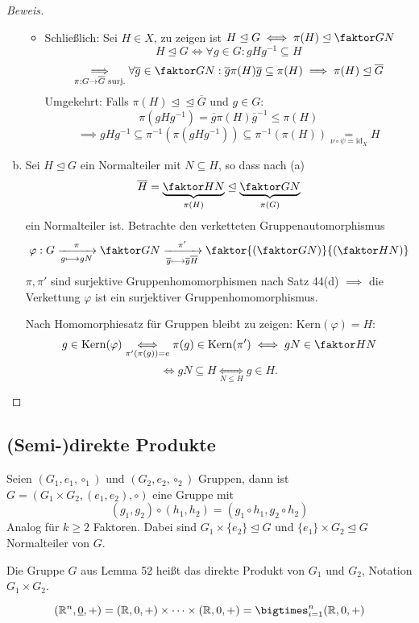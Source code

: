 \documentclass[a4paper]{report}
\begin{document}
\begin{satz}
\begin{proof}[Beweis]
\begin{enumerate}[(a)]
\begin{itemize}
  \item Schließlich: Sei $H \in X$, zu zeigen ist $H \trianglelefteq G \iff \pi(H) \trianglelefteq \faktor GN$
        $$H \trianglelefteq G \iff \forall g \in G : gHg^{-1} \subseteq H$$
        $$\underset{\pi: G \to \overline G \text{ surj.}}\implies \forall \overline g \in \faktor GN: \overline g \pi(H)\overline g \subseteq \pi(H) \implies \pi(H) \trianglelefteq \overline G$$
        Umgekehrt: Falls $\pi(H) \trianglelefteq \trianglelefteq \overline G$ und $g \in G$:
        $$\pi(gHg^{-1}) = \overline g\pi(H)\overline g^{-1} \le \pi(H)$$
        $$\implies gHg^{-1} \subseteq \pi^{-1}(\pi(gHg^{-1})) \subseteq \pi^{-1}(\pi(H)) \underset{\nu \circ \psi = \mathrm{id}_{X}} = H$$
\end{itemize}
    \item Sei $H \trianglelefteq G$ ein Normalteiler mit $N \subseteq H$, so dass nach (a)
          $$\overline H = \underbrace{\faktor HN}_{\pi(H)} \trianglelefteq \underbrace{\faktor GN}_{\pi(G)}$$
          ein Normalteiler ist. Betrachte den verketteten Gruppenautomorphismus
          $$\varphi : G \xrightarrow[g \longmapsto gN]{\pi}\faktor GN \xrightarrow[\overline g \longmapsto \overline g \overline H]{\pi'} \faktor{\left(\faktor GN\right)}{\left(\faktor HN\right)}$$
          $\pi, \pi'$ sind surjektive Gruppenhomomorphismen nach Satz 44(d) $\implies$ die Verkettung $\varphi$ ist ein surjektiver Gruppenhomomorphismus.

          Nach Homomorphiesatz für Gruppen bleibt zu zeigen: $\mathrm{Kern}(\varphi) = H$:
          $$g \in \mathrm{Kern}(\varphi) \underset{\pi'(\pi(g))=e}\iff\pi(g) \in \mathrm{Kern}(\pi') \iff gN \in \faktor HN$$
          $$\iff gN \subseteq H \underset{N \le H}\iff g \in H.$$
  \end{enumerate}
\end{proof}
\end{satz}

\subsection*{(Semi-)direkte Produkte}%
\label{sec:Direkte Produkte}
\begin{lemm}[Übung]
  Seien $(G_{1}, e_{1}, \circ_{1})$ und $(G_{2}, e_{2}, \circ_{2})$ Gruppen, dann ist $G = (G_{1} \times G_{2}, (e_{1}, e_{2}), \circ)$ eine Gruppe mit
  $$(g_{1}, g_{2}) \circ (h_{1}, h_{2}) = (g_{1} \circ h_{1}, g_{2} \circ h_{2})$$
  Analog für $k \ge 2$ Faktoren. Dabei sind $G_{1} \times \{e_{2}\} \trianglelefteq G$ und $\{e_{1}\} \times G_{2} \trianglelefteq G$ Normalteiler von $G$.
\end{lemm}
\begin{defi} Die Gruppe $G$ aus Lemma 52 heißt das direkte Produkt von $G_{1}$ und $G_{2}$, Notation $G_{1} \times G_{2}$.
\end{defi}
\begin{bsp*}
$$(\Bbb R^{n}, \underline 0, +) = (\Bbb R, 0, +) \times \cdots \times (\Bbb R, 0, +) = \bigtimes_{i = 1}^{n}(\Bbb R, 0, +)$$
\end{bsp*}
\end{document}
